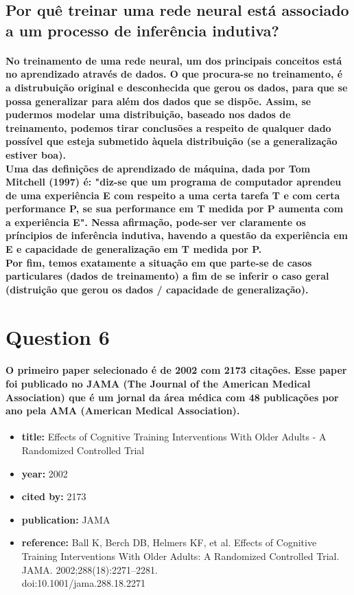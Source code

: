 \documentclass[a4paper]{article}    %
\begin{document}
\subsection*{Por quê treinar uma rede neural está associado a um processo de inferência indutiva?}

\paragraph{No treinamento de uma rede neural, um dos principais conceitos está no aprendizado através de dados. O que procura-se no treinamento, é a distrubuição original e desconhecida que gerou os dados, para que se possa generalizar para além dos dados que se dispõe. Assim, se pudermos modelar uma distribuição, baseado nos dados de treinamento, podemos tirar conclusões a respeito de qualquer dado possível que esteja submetido àquela distribuição (se a generalização estiver boa).\\
Uma das definições de aprendizado de máquina, dada por Tom Mitchell (1997) é: "diz-se que um programa de computador aprendeu de uma experiência E com respeito a uma certa tarefa T e com certa performance P, se sua performance em T medida por P aumenta com a experiência E". Nessa afirmação, pode-ser ver claramente os príncipios de inferência indutiva, havendo a questão da experiência em E e capacidade de generalização em T medida por P.\\
Por fim, temos exatamente a situação em que parte-se de casos particulares (dados de treinamento) a fim de se inferir o caso geral (distruição que gerou os dados / capacidade de generalização).}

\newpage

\section*{Question 6}

\paragraph{O primeiro paper selecionado é de 2002 com 2173 citações. Esse paper foi publicado no JAMA (The Journal of the American Medical Association) que é um jornal da área médica com 48 publicações por ano pela AMA (American Medical Association).}
\begin{itemize}
    \item \textbf{title:} Effects of Cognitive Training Interventions With Older Adults - A Randomized Controlled Trial
    \item \textbf{year:} 2002
    \item \textbf{cited by:} 2173
    \item \textbf{publication:} JAMA
    \item \textbf{reference:} Ball K, Berch DB, Helmers KF, et al. Effects of Cognitive Training Interventions With Older Adults: A Randomized Controlled Trial. JAMA. 2002;288(18):2271–2281.\\ doi:10.1001/jama.288.18.2271
\end{itemize}
\end{document}
